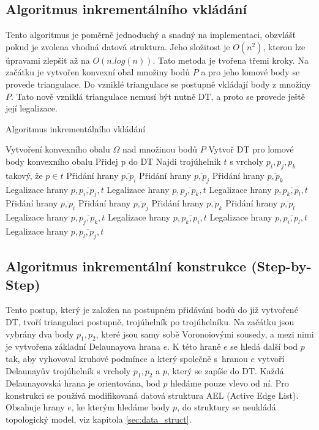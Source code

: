 \documentclass[12pt,a4paper]{article}
\begin{document}
\newpage
\subsection{Algoritmus inkrementálního vkládání}
\label{subsec:Inc_alg}

Tento algoritmus je poměrně jednoduchý a snadný na implementaci,
obzvlášť pokud je zvolena vhodná datová struktura. Jeho složitost je
$O(n^2)$, kterou lze úpravami zlepšit až na $O(n.log(n))$. Tato
metoda je tvořena třemi kroky. Na začátku je vytvořen konvexní obal
množiny bodů $P$ a pro jeho lomové body se provede triangulace. Do
vzniklé triangulace se postupně vkládají body z množiny $P$. Tato nově
vzniklá triangulace nemusí být nutně DT, a proto se provede ještě její
legalizace.

\begin{algorithm}
\caption{Algoritmus inkrementálního vkládání}
\begin{algorithmic}[1]
\State Vytvoření konvexního obalu $\Omega$ nad množinou bodů $P$
\State Vytvoř DT pro lomové body konvexního obalu
	\State Přidej p do DT
	\State Najdi trojúhelník $t$ s vrcholy $p_i, p_j, p_k$ takový, že $p \in t$
		\State Přidání hrany $\overline{p,p_i}$
		\State Přidání hrany $\overline{p,p_j}$
		\State Přidání hrany $\overline{p,p_k}$
		\State Legalizace hrany $p,\overline{p_i,p_j},t$
		\State Legalizace hrany $p,\overline{p_j,p_k},t$
		\State Legalizace hrany $p,\overline{p_k,p_l},t$
		\State Přidání hrany $\overline{p,p_i}$
		\State Přidání hrany $\overline{p,p_j}$
		\State Přidání hrany $\overline{p,p_k}$
		\State Přidání hrany $\overline{p,p_l}$
		\State Legalizace hrany $p,\overline{p_j,p_k},t$
		\State Legalizace hrany $p,\overline{p_k,p_i},t$
		\State Legalizace hrany $p,\overline{p_i,p_l},t$
		\State Legalizace hrany $p,\overline{p_l,p_j},t$
	\EndIf
\EndFor
\end{algorithmic}
\end{algorithm}

\newpage
\subsection{Algoritmus inkrementální konstrukce (Step-by-Step)}

Tento postup, který je založen na postupném přidávání bodů do již
vytvořené DT, tvoří triangulaci postupně, trojúhelník po
trojúhelníku. Na začátku jsou vybrány dva body $p_1, p_2$, které jsou
samy sobě Voronoiovými sousedy, a mezi nimi je vytvořena základní
Delaunayova hrana $e$. K této hraně $e$ se hledá další bod $p$ tak,
aby vyhovoval kruhové podmínce a který společně s~hranou $e$ vytvoří
Delaunayův trojúhelník s vrcholy $p_1, p_2$ a $p$, který se zapíše do
DT. Každá Delaunayovská hrana je orientována, bod $p$ hledáme pouze
vlevo od ní. Pro konstrukci se používá modifikovaná datová struktura
AEL (Active Edge List). Obsahuje hrany $e$, ke kterým hledáme body
$p$, do struktury se neukládá topologický model, viz kapitola
\ref{sec:data_struct}.
\end{document}
